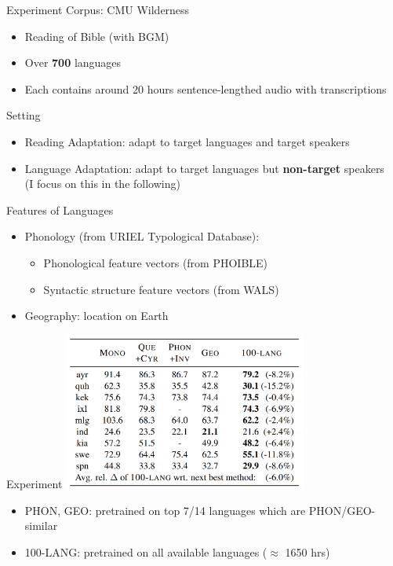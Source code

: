 \documentclass{beamer}
\begin{document}
\begin{frame}{Experiment}
  Corpus: CMU Wilderness
  \begin{itemize}
    \item Reading of Bible (with BGM)
    \item Over \textbf{700} languages
    \item Each contains around 20 hours sentence-lengthed audio with transcriptions
  \end{itemize}
  Setting
  \begin{itemize}
    \item Reading Adaptation: adapt to target languages and target speakers
    \item Language Adaptation: adapt to target languages but \textbf{non-target} speakers\\
      (I focus on this in the following)
  \end{itemize}
\end{frame}

\begin{frame}{Features of Languages}
  \begin{itemize}
    \item Phonology (from URIEL Typological Database):
      \begin{itemize}
        \item Phonological feature vectors (from PHOIBLE)
        \item Syntactic structure feature vectors (from WALS)
      \end{itemize}
    \item Geography: location on Earth
  \end{itemize}
\end{frame}

\begin{frame}{Experiment}
  \center \includegraphics[width=0.6\textwidth]{fig/p2-result.png}

  \begin{itemize}
    \item PHON, GEO: pretrained on top 7/14 languages which are PHON/GEO-similar
    \item 100-LANG: pretrained on all available languages ($\approx$ 1650 hrs)
  \end{itemize}
\end{frame}
\end{document}
